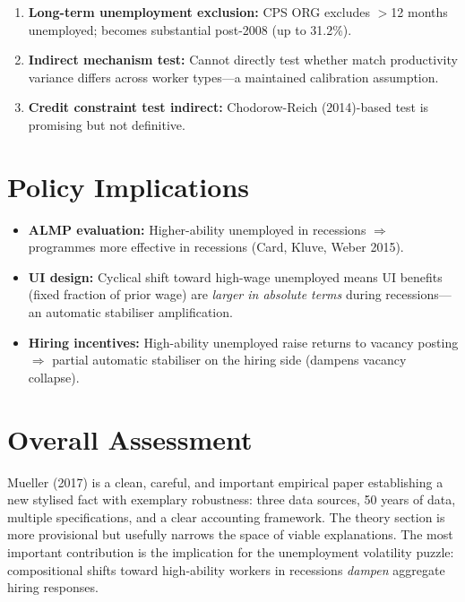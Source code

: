 \begin{enumerate}
  \item \textbf{Long-term unemployment exclusion:} CPS ORG excludes $>$12
    months unemployed; becomes substantial post-2008 (up to 31.2\%).
  \item \textbf{Indirect mechanism test:} Cannot directly test whether
    match productivity variance differs across worker types---a maintained
    calibration assumption.
  \item \textbf{Credit constraint test indirect:} Chodorow-Reich (2014)-based
    test is promising but not definitive.
\end{enumerate}

\section{Policy Implications}

\begin{itemize}
  \item \textbf{ALMP evaluation:} Higher-ability unemployed in recessions
    $\Rightarrow$ programmes more effective in recessions (Card, Kluve,
    Weber 2015).
  \item \textbf{UI design:} Cyclical shift toward high-wage unemployed
    means UI benefits (fixed fraction of prior wage) are \emph{larger in
    absolute terms} during recessions---an automatic stabiliser amplification.
  \item \textbf{Hiring incentives:} High-ability unemployed raise returns
    to vacancy posting $\Rightarrow$ partial automatic stabiliser on the
    hiring side (dampens vacancy collapse).
\end{itemize}

\section{Overall Assessment}

Mueller (2017) is a clean, careful, and important empirical paper establishing
a new stylised fact with exemplary robustness: three data sources, 50 years
of data, multiple specifications, and a clear accounting framework. The theory
section is more provisional but usefully narrows the space of viable
explanations. The most important contribution is the implication for the
unemployment volatility puzzle: compositional shifts toward high-ability
workers in recessions \emph{dampen} aggregate hiring responses.

